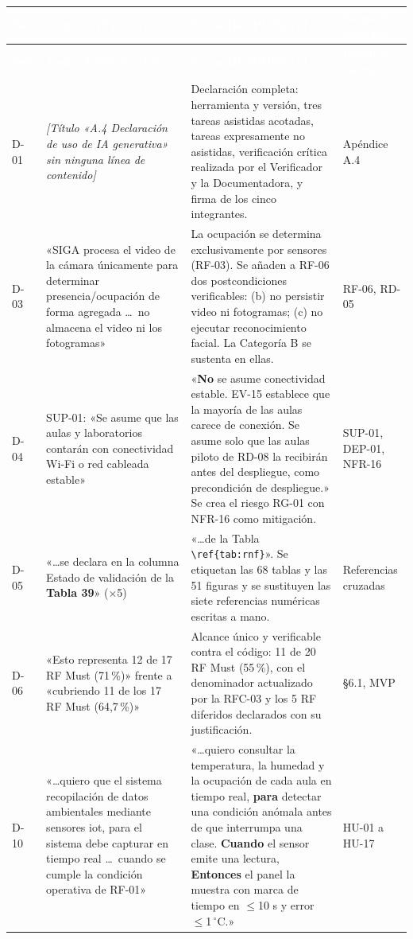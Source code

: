 \documentclass[11pt,letterpaper]{article}
\newcommand{\thead}[1]{\cellcolor{uteqverde}\textcolor{white}{\textbf{#1}}}
\begin{document}
\small
\begin{longtable}{|p{0.85cm}|p{5.4cm}|p{5.4cm}|p{2.4cm}|}
\hline
\thead{Def.} & \thead{Texto ANTES (v1.0)} & \thead{Texto DESPUÉS (v1.1)} & \thead{Requisito afectado} \\ \hline
\endfirsthead
\hline
\thead{Def.} & \thead{Texto ANTES (v1.0)} & \thead{Texto DESPUÉS (v1.1)} & \thead{Requisito afectado} \\ \hline
\endhead
D-01 & \emph{[Título «A.4 Declaración de uso de IA generativa» sin ninguna línea de contenido]} & Declaración completa: herramienta y versión, tres tareas asistidas acotadas, tareas expresamente no asistidas, verificación crítica realizada por el Verificador y la Documentadora, y firma de los cinco integrantes. & Apéndice A.4 \\ \hline
D-03 & «SIGA procesa el video de la cámara únicamente para determinar presencia/ocupación de forma agregada \dots\ no almacena el video ni los fotogramas» & La ocupación se determina exclusivamente por sensores (RF-03). Se añaden a RF-06 dos postcondiciones verificables: (b) no persistir video ni fotogramas; (c) no ejecutar reconocimiento facial. La Categoría B se sustenta en ellas. & RF-06, RD-05 \\ \hline
D-04 & SUP-01: «Se asume que las aulas y laboratorios contarán con conectividad Wi-Fi o red cableada estable» & «\textbf{No} se asume conectividad estable. EV-15 establece que la mayoría de las aulas carece de conexión. Se asume solo que las aulas piloto de RD-08 la recibirán antes del despliegue, como precondición de despliegue.» Se crea el riesgo RG-01 con NFR-16 como mitigación. & SUP-01, DEP-01, NFR-16 \\ \hline
D-05 & «\dots se declara en la columna Estado de validación de la \textbf{Tabla 39}» ($\times$5) & «\dots de la Tabla \texttt{\textbackslash ref\{tab:rnf\}}». Se etiquetan las 68 tablas y las 51 figuras y se sustituyen las siete referencias numéricas escritas a mano. & Referencias cruzadas \\ \hline
D-06 & «Esto representa 12 de 17 RF Must (71\,\%)» frente a «cubriendo 11 de los 17 RF Must (64,7\,\%)» & Alcance único y verificable contra el código: 11 de 20 RF Must (55\,\%), con el denominador actualizado por la RFC-03 y los 5 RF diferidos declarados con su justificación. & \S6.1, MVP \\ \hline
D-10 & «\dots quiero que el sistema recopilación de datos ambientales mediante sensores iot, para el sistema debe capturar en tiempo real \dots\ cuando se cumple la condición operativa de RF-01» & «\dots quiero consultar la temperatura, la humedad y la ocupación de cada aula en tiempo real, \textbf{para} detectar una condición anómala antes de que interrumpa una clase. \textbf{Cuando} el sensor emite una lectura, \textbf{Entonces} el panel la muestra con marca de tiempo en $\leq$10 s y error $\leq$1\,$^{\circ}$C.» & HU-01 a HU-17 \\ \hline

\end{longtable}
\end{document}

